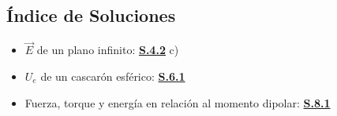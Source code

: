 \subsection{Índice de Soluciones}

\begin{itemize}
    \item $\Vec{E}$ de un plano infinito: \hyperlink{S.4.2}{\textbf{S.4.2}} c)
    \item $U_e$ de un cascarón esférico: \hyperlink{S.6.1}{\textbf{S.6.1}}
    \item Fuerza, torque y energía en relación al momento dipolar: \hyperlink{S.8.1}{\textbf{S.8.1}}
\end{itemize}

\newpage